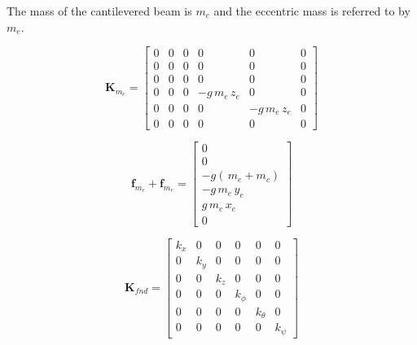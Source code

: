 \documentclass{article}
\begin{document}
The mass of the cantilevered beam is $m_c$ and the eccentric mass is referred to by $m_e$. 

\begin{small}
    \begin{equation}
        \mathbf{K}_{m_e} =
        \begin{bmatrix}
       0 & 0 & 0 &         0        &        0         & 0 \\ 
       0 & 0 & 0 &         0        &        0         & 0 \\ 
       0 & 0 & 0 &         0        &        0         & 0 \\ 
       0 & 0 & 0 & -g\,m_{e}\,z_{e} &        0         & 0 \\ 
       0 & 0 & 0 &         0        & -g\,m_{e}\,z_{e} & 0 \\ 
       0 & 0 & 0 &         0        &        0         & 0
        \end{bmatrix}
        \label{eq:fea:K_m_ecc}
    \end{equation}
\end{small}

\begin{small}
    \begin{equation}
        \mathbf{f}_{m_c} + \mathbf{f}_{m_e} = 
        \begin{bmatrix}
         0\\ 0\\ -g(\,m_{e}+m_{c})\\ -g\,m_{e}\,y_{e}\\ g\,m_{e}\,x_{e} \\ 0
        \end{bmatrix}
        \label{eq:fea:Fstat}
    \end{equation}
\end{small}

\begin{small}
    \begin{equation}
        \mathbf{K}_{fnd} =
        \begin{bmatrix}
         k_{x} &     0 & 0     & 0         & 0           & 0         \\ 
         0     & k_{y} & 0     & 0         & 0           & 0         \\
         0     & 0     & k_{z} & 0         & 0           & 0         \\
         0     & 0     & 0     & k_{\phi } & 0           & 0         \\
         0     & 0     & 0     & 0         & k_{\theta } & 0         \\ 
         0     & 0     & 0     & 0         & 0           & k_{\psi } 
        \end{bmatrix}
        \label{eq:fea:K_fnd}
    \end{equation}
\end{small}
\end{document}
